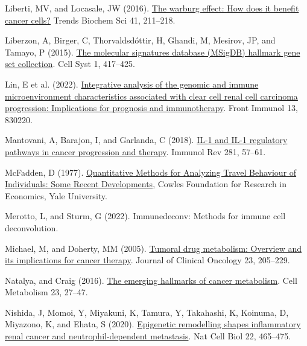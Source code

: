\documentclass[
  parskip,
  oneside]{scrreprt}
\newlength{\cslhangindent}
\newlength{\cslentryspacingunit} %
\newenvironment{CSLReferences}[2] %
 {%
  \setlength{\parindent}{0pt}
  \ifodd #1
  \let\oldpar\par
  \def\par{\hangindent=\cslhangindent\oldpar}
  \fi
  \setlength{\parskip}{#2\cslentryspacingunit}
 }%
 {}
\begin{document}
\begin{CSLReferences}{0}{0}
\leavevmode{}%
Liberti, MV, and Locasale, JW (2016).
\href{https://doi.org/10.1016/j.tibs.2015.12.001}{The warburg effect:
How does it benefit cancer cells?} Trends Biochem Sci 41, 211--218.

\leavevmode{}%
Liberzon, A, Birger, C, Thorvaldsdóttir, H, Ghandi, M, Mesirov, JP, and
Tamayo, P (2015). \href{https://doi.org/10.1016/j.cels.2015.12.004}{The
molecular signatures database (MSigDB) hallmark gene set collection}.
Cell Syst 1, 417--425.

\leavevmode{}%
Lin, E et al. (2022).
\href{https://doi.org/10.3389/fimmu.2022.830220}{Integrative analysis of
the genomic and immune microenvironment characteristics associated with
clear cell renal cell carcinoma progression: Implications for prognosis
and immunotherapy}. Front Immunol 13, 830220.

\leavevmode{}%
Mantovani, A, Barajon, I, and Garlanda, C (2018).
\href{https://doi.org/10.1111/imr.12614}{IL-1 and IL-1 regulatory
pathways in cancer progression and therapy}. Immunol Rev 281, 57--61.

\leavevmode{}%
McFadden, D (1977). \href{}{{Quantitative Methods for Analyzing Travel
Behaviour of Individuals: Some Recent Developments}}, Cowles Foundation
for Research in Economics, Yale University.

\leavevmode{}%
Merotto, L, and Sturm, G (2022). Immunedeconv: Methods for immune cell
deconvolution.

\leavevmode{}%
Michael, M, and Doherty, MM (2005).
\href{https://doi.org/10.1200/jco.2005.02.120}{Tumoral drug metabolism:
Overview and its implications for cancer therapy}. Journal of Clinical
Oncology 23, 205--229.

\leavevmode{}%
Natalya, and Craig (2016).
\href{https://doi.org/10.1016/j.cmet.2015.12.006}{The emerging hallmarks
of cancer metabolism}. Cell Metabolism 23, 27--47.

\leavevmode{}%
Nishida, J, Momoi, Y, Miyakuni, K, Tamura, Y, Takahashi, K, Koinuma, D,
Miyazono, K, and Ehata, S (2020).
\href{https://doi.org/10.1038/s41556-020-0491-2}{Epigenetic remodelling
shapes inflammatory renal cancer and neutrophil-dependent metastasis}.
Nat Cell Biol 22, 465--475.


\end{CSLReferences}
\end{document}
